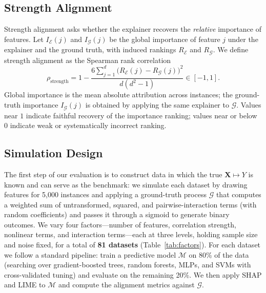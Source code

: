 \documentclass[12pt,letterpaper]{article}
\newcommand{\mG}{\mathcal{G}}
\newcommand{\mM}{\mathcal{M}}
\newcommand{\mE}{\mathcal{E}}
\newcommand{\Xto}{\mathbf{X}\mapsto Y}
\begin{document}
\subsection{Strength Alignment}
Strength alignment asks whether the explainer recovers the \emph{relative}
importance of features. Let $I_{\mE}(j)$ and $I_{\mG}(j)$ be the global importance
of feature $j$ under the explainer and the ground truth, with induced rankings
$R_{\mE}$ and $R_{\mG}$. We define strength alignment as the Spearman rank
correlation
\begin{equation}\label{eq:strength}
\rho_{\text{strength}}=1-\frac{6\sum_{j=1}^{d}\big(R_{\mE}(j)-R_{\mG}(j)\big)^2}{d(d^2-1)}\in[-1,1].
\end{equation}
Global importance is the mean absolute attribution across instances; the
ground-truth importance $I_{\mG}(j)$ is obtained by applying the same explainer to
$\mG$. Values near $1$ indicate faithful recovery of the importance ranking; values
near or below $0$ indicate weak or systematically incorrect ranking.

\subsection{Simulation Design}
\label{sec:data}
The first step of our evaluation is to construct data in which the true $\Xto$ is
known and can serve as the benchmark: we simulate each dataset by drawing
features for 5{,}000 instances and applying a ground-truth process $\mG$ that
computes a weighted sum of untransformed, squared, and pairwise-interaction terms
(with random coefficients) and passes it through a sigmoid to generate binary
outcomes. We vary four factors---number of features, correlation
strength, nonlinear terms, and interaction terms---each at three levels, holding
sample size and noise fixed, for a total of \textbf{81 datasets}
(Table~\ref{tab:factors}). For each dataset we follow a standard pipeline: train a
predictive model $\mM$ on 80\% of the data (searching over gradient-boosted trees,
random forests, MLPs, and SVMs with cross-validated tuning) and evaluate on the
remaining 20\%. We then apply SHAP and LIME to $\mM$ and compute the alignment
metrics against $\mG$.
\end{document}
